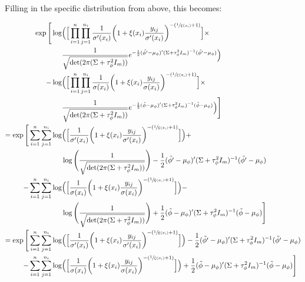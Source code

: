 \documentclass{article}
\begin{document}
Filling in the specific distribution from above, this becomes:

\begin{align*}
 \exp \Bigg[ \log & \Big( \Big[ \prod_{i=1}^n \prod_{j=1}^{n_i} \frac{1}{\sigma'(x_i)} \bigg( 1 + \xi(x_i) \frac{y_{ij}}{\sigma'(x_i)} \bigg)^{-(\sfrac{1}{\xi(x_i)} + 1)} \Big] \times \\
& \frac{1}{\sqrt{\det(2 \pi (\Sigma + \tau^2_\phi I_m))}} e^{-\frac{1}{2} (\tilde{\phi'} - \mu_\phi)' (\Sigma + \tau^2_\phi I_m)^{-1} (\tilde{\phi'} - \mu_\phi) } \Big) \\
- \log & \Big( \Big[ \prod_{i=1}^n \prod_{j=1}^{n_i} \frac{1}{\sigma(x_i)} \bigg( 1 + \xi(x_i) \frac{y_{ij}}{\sigma(x_i)} \bigg)^{-(\sfrac{1}{\xi(x_i)} + 1)} \Big] \times \\
& \frac{1}{\sqrt{\det(2 \pi (\Sigma + \tau^2_\phi I_m))}} e^{-\frac{1}{2} (\tilde{\phi} - \mu_\phi)' (\Sigma + \tau^2_\phi I_m)^{-1} (\tilde{\phi} - \mu_\phi) } \Big) \Bigg] \\
= \exp \Bigg[ \sum_{i=1}^n \sum_{j=1}^{n_i} \log & \Big( \Big[ \frac{1}{\sigma'(x_i)} \bigg( 1 + \xi(x_i) \frac{y_{ij}}{\sigma'(x_i)} \bigg)^{-(\sfrac{1}{\xi(x_i)} + 1)} \Big] \Big) + \\
& \log \Bigg( \frac{1}{\sqrt{\det(2 \pi (\Sigma + \tau^2_\phi I_m))}} \Bigg) -\frac{1}{2} (\tilde{\phi'} - \mu_\phi)' (\Sigma + \tau^2_\phi I_m)^{-1} (\tilde{\phi'} - \mu_\phi) \\
- \sum_{i=1}^n \sum_{j=1}^{n_i} \log & \Big( \Big[  \frac{1}{\sigma(x_i)} \bigg( 1 + \xi(x_i) \frac{y_{ij}}{\sigma(x_i)} \bigg)^{-(\sfrac{1}{\xi(x_i)} + 1)} \Big] \Big) - \\
& \log \Bigg( \frac{1}{\sqrt{\det(2 \pi (\Sigma + \tau^2_\phi I_m))}} \Bigg) +\frac{1}{2} (\tilde{\phi} - \mu_\phi)' (\Sigma + \tau^2_\phi I_m)^{-1} (\tilde{\phi} - \mu_\phi) \Bigg] \\
= \exp \Bigg[ \sum_{i=1}^n \sum_{j=1}^{n_i} \log & \Big( \Big[ \frac{1}{\sigma'(x_i)} \bigg( 1 + \xi(x_i) \frac{y_{ij}}{\sigma'(x_i)} \bigg)^{-(\sfrac{1}{\xi(x_i)} + 1)} \Big] \Big) -\frac{1}{2} (\tilde{\phi'} - \mu_\phi)' (\Sigma + \tau^2_\phi I_m)^{-1} (\tilde{\phi'} - \mu_\phi) \\
- \sum_{i=1}^n \sum_{j=1}^{n_i} \log & \Big( \Big[  \frac{1}{\sigma(x_i)} \bigg( 1 + \xi(x_i) \frac{y_{ij}}{\sigma(x_i)} \bigg)^{-(\sfrac{1}{\xi(x_i)} + 1)} \Big] \Big) +\frac{1}{2} (\tilde{\phi} - \mu_\phi)' (\Sigma + \tau^2_\phi I_m)^{-1} (\tilde{\phi} - \mu_\phi) \Bigg]
\end{align*}
\end{document}
